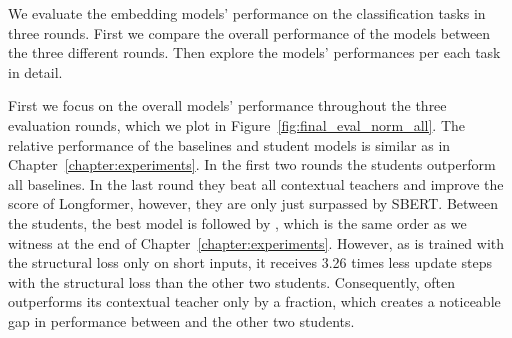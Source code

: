 We evaluate the embedding models' performance on the classification tasks in
three rounds. First we compare the overall performance of the models between
the three different rounds. Then explore the models' performances per each task
in detail.


First we focus on the overall models' performance throughout the three
evaluation rounds, which we plot in Figure~\ref{fig:final_eval_norm_all}. The
relative performance of the baselines and student models is similar as in
Chapter~\ref{chapter:experiments}. In the first two rounds the students
outperform all baselines. In the last round they beat all contextual teachers
and improve the score of Longformer, however, they are only just surpassed by
SBERT. Between the students, the best model is {\OnlyMSEStudent} followed by
{\MSEStudent}, which is the same order as we witness at the end of
Chapter~\ref{chapter:experiments}. However, as {\CosineStudent} is trained with
the structural loss only on short inputs, it receives 3.26 times less update
steps with the structural loss than the other two students. Consequently,
{\CosineStudent} often outperforms its contextual teacher only by a fraction,
which creates a noticeable gap in performance between {\CosineStudent} and the
other two students.

